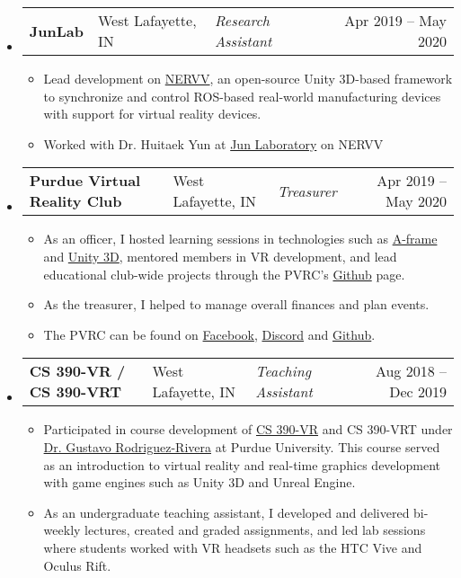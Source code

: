 \documentclass[11pt]{extarticle}
\makeatletter
\newcommand{\entry}[5]{
	\begin{tabularx}{\linewidth}{l@{, }l@{ – }lXr}
			\textbf{#1} & #2 & \lighttext \textit{#3} & & #4 – #5
	\end{tabularx}
	\vspace{-16pt}
}
\makeatother
\begin{document}
\begin{itemize}[leftmargin=1em]
	\item[]
	\entry{JunLab}{West Lafayette, IN}{Research Assistant}{Apr 2019}{May 2020}
	\begin{itemize}
		\item Lead development on
		\href{https://github.com/oliviasculley/nervv}{NERVV}, an open-source Unity
		3D-based framework to synchronize and control ROS-based real-world
		manufacturing devices with support for virtual reality devices.
		\item Worked with Dr. Huitaek Yun at
		\href{https://web.ics.purdue.edu/~jun25/}{Jun Laboratory} on NERVV
	\end{itemize}

	\item[]
	\entry{Purdue Virtual Reality Club}{West Lafayette, IN}{Treasurer}{Apr 2019}{May 2020}
	\begin{itemize}
		\item As an officer, I hosted learning sessions in technologies such as
		\href{https://aframe.io/}{A-frame} and \href{https://unity.com/}{Unity 3D},
		mentored members in VR development, and lead educational club-wide projects
		through the PVRC's \href{https://github.com/pvrc}{Github} page.
		\item As the treasurer, I helped to manage overall finances and plan events.
		\item The PVRC can be found on
		\href{https://www.facebook.com/groups/777681062280083/}{Facebook},
		\href{https://discord.gg/2bnDcKE}{Discord} and
		\href{https://github.com/pvrc}{Github}.
	\end{itemize}

	\item[]
	\entry{CS 390-VR / CS 390-VRT}{West Lafayette, IN}{Teaching Assistant}{Aug 2018}{Dec 2019}
	\begin{itemize}
		\item Participated in course development of
		\href{https://www.cs.purdue.edu/homes/cs390vr/}{CS 390-VR} and CS 390-VRT
		under \href{https://www.cs.purdue.edu/people/faculty/grr}{Dr. Gustavo
		Rodriguez-Rivera} at Purdue University. This course served as an
		introduction to virtual reality and real-time graphics development with game
		engines such as Unity 3D and Unreal Engine.
		\item As an undergraduate teaching assistant, I developed and delivered
		bi-weekly lectures, created and graded assignments, and led lab sessions
		where students worked with VR headsets such as the HTC Vive and Oculus Rift.
	\end{itemize}


\end{itemize}
\end{document}
